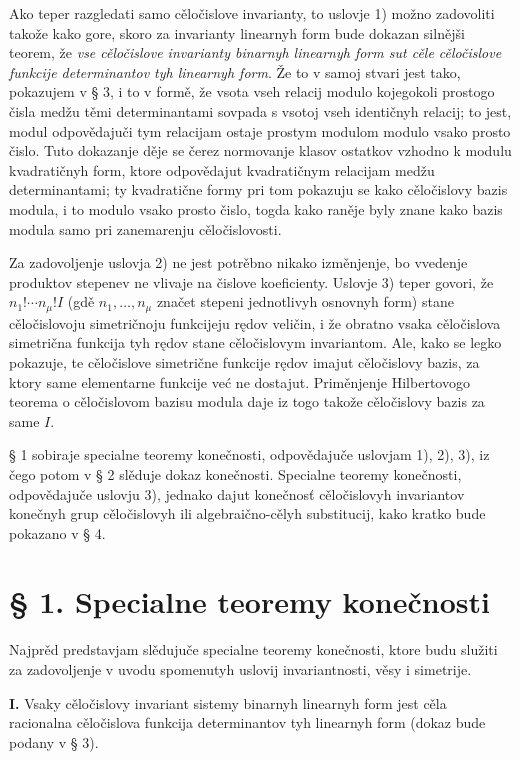 \documentclass[11pt]{article}
\begin{document}
Ako teper razgledati samo cěločislove invarianty, to uslovje 1) možno zadovoliti takože kako gore, skoro za invarianty linearnyh form bude dokazan silnějši teorem, že {\itshape vse cěločislove invarianty binarnyh linearnyh form sut cěle cěločislove funkcije determinantov tyh linearnyh form}. Že to v samoj stvari jest tako, pokazujem v § 3, i to v formě, že vsota vseh relacij modulo kojegokoli prostogo čisla medžu těmi determinantami sovpada s vsotoj vseh identičnyh relacij; to jest, modul odpovědajuči tym relacijam ostaje prostym modulom modulo vsako prosto čislo. Tuto dokazanje děje se čerez normovanje klasov ostatkov vzhodno k modulu kvadratičnyh form, ktore odpovědajut kvadratičnym relacijam medžu determinantami; ty kvadratične formy pri tom pokazuju se kako cěločislovy bazis modula, i to modulo vsako prosto čislo, togda kako raněje byly znane kako bazis modula samo pri zanemarenju cěločislovosti.

Za zadovoljenje uslovja 2) ne jest potrěbno nikako izměnjenje, bo vvedenje produktov stepenev ne vlivaje na čislove koeficienty. Uslovje 3) teper govori, že \(n_1!\cdots n_\mu! I\) (gdě \(n_1,\ldots,n_\mu\) značet stepeni jednotlivyh osnovnyh form) stane cěločislovoju simetričnoju funkcijeju rędov veličin, i že obratno vsaka cěločislova simetrična funkcija tyh rędov stane cěločislovym invariantom. Ale, kako se legko pokazuje, te cěločislove simetrične funkcije rędov imajut cěločislovy bazis, za ktory same elementarne funkcije već ne dostajut. Priměnjenje Hilbertovogo teorema o cěločislovom bazisu modula daje iz togo takože cěločislovy bazis za same \(I\).

§ 1 sobiraje specialne teoremy konečnosti, odpovědajuče uslovjam 1), 2), 3), iz čego potom v § 2 slěduje dokaz konečnosti. Specialne teoremy konečnosti, odpovědajuče uslovju 3), jednako dajut konečnosť cěločislovyh invariantov konečnyh grup cěločislovyh ili algebraično-cělyh substitucij, kako kratko bude pokazano v § 4.

\section*{§ 1. Specialne teoremy konečnosti}

Najprěd predstavjam slědujuče specialne teoremy konečnosti, ktore budu služiti za zadovoljenje v uvodu spomenutyh uslovij invariantnosti, věsy i simetrije.

\textbf{I.} Vsaky cěločislovy invariant sistemy binarnyh linearnyh form jest cěla racionalna cěločislova funkcija determinantov tyh linearnyh form (dokaz bude podany v § 3).
\end{document}
